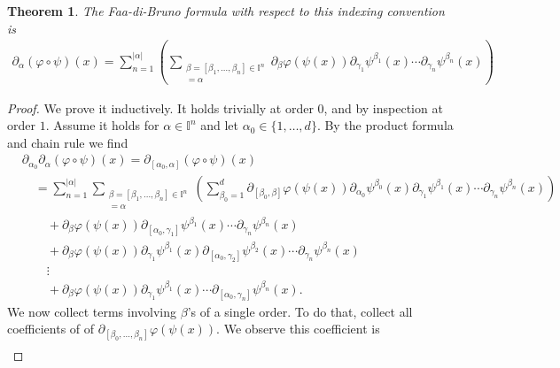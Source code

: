 \documentclass[12pt]{amsart}
\newtheorem{thm}{Theorem}[section]
\begin{document}
\begin{thm}
The Faa-di-Bruno formula with respect to this indexing convention is
\begin{align*}
  \partial_\alpha( \varphi \circ \psi)(x) = \sum_{n=1}^{|\alpha|} \left(
  \sum_{ 
    \substack{
      \beta = [\beta_1,\dots,\beta_n] \in \mathbb{I}^n \\
      [\gamma_1,\dots,\gamma_n] = \alpha 
      }
    }
    \partial_\beta \varphi(\psi(x)) \partial_{\gamma_1} \psi^{\beta_1}(x) \cdots \partial_{\gamma_n} \psi^{\beta_n}(x)
  \right) 
\end{align*}
\end{thm}
\begin{proof}
  We prove it inductively.  It holds trivially at order $0$,
  and by inspection at order $1$.
  Assume it holds for $\alpha \in \mathbb{I}^n$
  and let $\alpha_0 \in \{ 1,\dots,d\}$.
  By the product formula and chain rule we find
  \begin{align*}
    &\partial_{\alpha_0}\partial_\alpha( \varphi \circ \psi)(x) = 
    \partial_{[\alpha_0,\alpha]}( \varphi \circ \psi)(x) \\
    &\quad =\sum_{n=1}^{|\alpha|}
    \sum_{ 
      \substack{
        \beta = [\beta_1,\dots,\beta_n] \in \mathbb{I}^n \\
        [\gamma_1,\dots,\gamma_n] = \alpha 
        }
      }
      \left( \sum_{\beta_0=1}^d
        \partial_{[\beta_0,\beta]} \varphi(\psi(x))
        \partial_{\alpha_0} \psi^{\beta_0}(x)
        \partial_{\gamma_1} \psi^{\beta_1}(x) \cdots
        \partial_{\gamma_n} \psi^{\beta_n}(x)
      \right)\\
      &\qquad + \partial_{\beta} \varphi(\psi(x))
      \partial_{[\alpha_0,\gamma_1]} \psi^{\beta_1}(x) \cdots
      \partial_{\gamma_n} \psi^{\beta_n}(x) \\
      &\qquad + \partial_{\beta} \varphi(\psi(x))
      \partial_{\gamma_1} \psi^{\beta_1}(x) 
      \partial_{[\alpha_0,\gamma_2]} \psi^{\beta_2}(x)  \cdots
      \partial_{\gamma_n} \psi^{\beta_n}(x) \\
      &\qquad \vdots \\
      &\qquad + \partial_{\beta} \varphi(\psi(x))
      \partial_{\gamma_1} \psi^{\beta_1}(x) \cdots
      \partial_{[\alpha_0,\gamma_n]} \psi^{\beta_n}(x) . 
  \end{align*}
We now collect terms involving $\beta$'s of a single order.
To do that, collect all coefficients of of $\partial_{[\beta_0,\dots,\beta_n]} \varphi(\psi(x))$.
We observe this coefficient is
\begin{align*}

\end{align*}
\end{proof}
\end{document}

